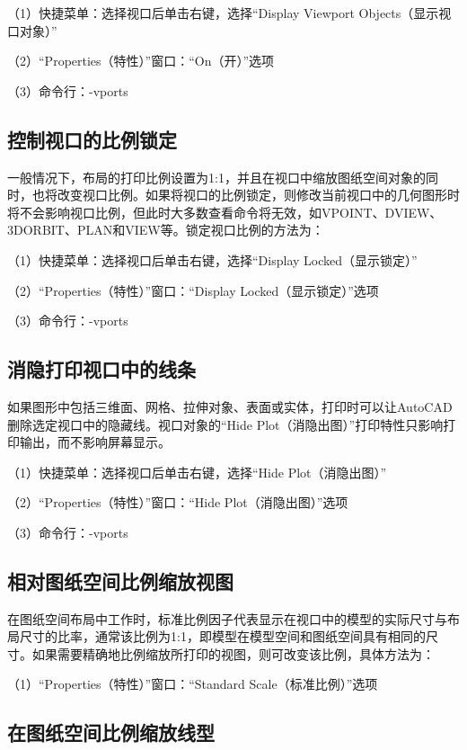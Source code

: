 （1）快捷菜单：选择视口后单击右键，选择“Display Viewport Objects（显示视口对象）”

（2）“Properties（特性）”窗口：“On（开）”选项

（3）命令行：-vports


\subsection{控制视口的比例锁定}

一般情况下，布局的打印比例设置为1:1，并且在视口中缩放图纸空间对象的同时，也将改变视口比例。如果将视口的比例锁定，则修改当前视口中的几何图形时将不会影响视口比例，但此时大多数查看命令将无效，如VPOINT、DVIEW、3DORBIT、PLAN和VIEW等。锁定视口比例的方法为：

（1）快捷菜单：选择视口后单击右键，选择“Display Locked（显示锁定）”

（2）“Properties（特性）”窗口：“Display Locked（显示锁定）”选项

（3）命令行：-vports

\subsection{消隐打印视口中的线条}

如果图形中包括三维面、网格、拉伸对象、表面或实体，打印时可以让AutoCAD删除选定视口中的隐藏线。视口对象的“Hide Plot（消隐出图）”打印特性只影响打印输出，而不影响屏幕显示。

（1）快捷菜单：选择视口后单击右键，选择“Hide Plot（消隐出图）”

（2）“Properties（特性）”窗口：“Hide Plot（消隐出图）”选项

（3）命令行：-vports


\subsection{相对图纸空间比例缩放视图}

在图纸空间布局中工作时，标准比例因子代表显示在视口中的模型的实际尺寸与布局尺寸的比率，通常该比例为1:1，即模型在模型空间和图纸空间具有相同的尺寸。如果需要精确地比例缩放所打印的视图，则可改变该比例，具体方法为：

（1）“Properties（特性）”窗口：“Standard Scale（标准比例）”选项


\subsection{在图纸空间比例缩放线型}

